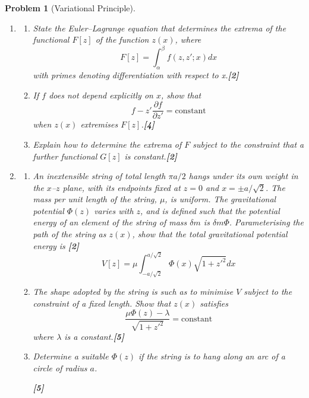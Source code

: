 \documentclass[a4paper]{article}
\theoremstyle{new}
\newtheorem{qns}{Problem}[section]
\begin{document}
\begin{qns}[Variational Principle]\leavevmode
\begin{enumerate}[label=(\alph*)]
\item
\begin{enumerate}[label=(\roman*)]
\item State the Euler–Lagrange equation that determines the extrema of the functional $F[z]$ of the function $z(x)$, where
$$F[z]=\int_\alpha^\beta f(z,z';x)dx$$
with primes denoting differentiation with respect to x.\hfill \textbf{[2]}
\item If $f$ does not depend explicitly on $x$, show that
$$f-z'\frac{\partial f}{\partial z'}=\text{constant}$$
when $z(x)$ extremises $F[z]$.\hfill \textbf{[4]}
\item Explain how to determine the extrema of $F$ subject to the constraint that a further functional $G[z]$ is constant.\hfill \textbf{[2]}
\end{enumerate}
\item
\begin{enumerate}[label=(\roman*)]
\item  An inextensible string of total length $\pi a/2$ hangs under its own weight in the $x$–$z$ plane, with its endpoints fixed at $z = 0$ and $x = \pm a/\sqrt{2}$. The mass per unit length of the string, $\mu$, is uniform. The gravitational potential $\Phi(z)$ varies with $z$, and is defined such that the potential energy of an element of the string of mass $\delta m$ is $\delta m\Phi$. Parameterising the path of the string as $z(x)$, show that the total gravitational potential energy is \hfill \textbf{[2]}
$$V[z]=\mu\int_{-a/\sqrt{2}}^{a/\sqrt{2}}\Phi(x)\sqrt{1+z'^2}dx$$
\item The shape adopted by the string is such as to minimise $V$ subject to the constraint of a fixed length. Show that $z(x)$ satisfies
$$\frac{\mu\Phi(z)-\lambda}{\sqrt{1+z'^2}}=\text{constant}$$
where $\lambda$ is a constant.\hfill \textbf{[5]}
\item Determine a suitable $\Phi(z)$ if the string is to hang along an arc of a circle of radius $a$. 

\hfill \textbf{[5]}
\end{enumerate}
\end{enumerate}
\end{qns}
\end{document}
